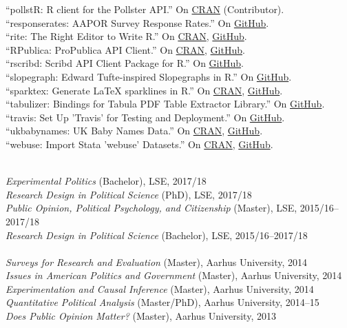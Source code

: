 \documentclass[12pt]{article}
\renewcommand{\section}[1]{\pagebreak[3]%
    \llap{\scshape\smash{\parbox[t]{\marginparwidth}{\raggedright {\color{lg}#1}}}}%
    \vspace{-\baselineskip}\par}
\newcommand{\topic}[1]{\pagebreak[3]\indent {\color{lg}{\footnotesize #1 }}\\}
\newcommand{\entry}[1]{\indent {\color{lg}\guillemotright}\hspace{2pt}#1\vspace{.25em}\\}
\begin{document}
	\entry{``pollstR: R client for the Pollster API.'' On \href{https://cran.r-project.org/package=pollstR}{CRAN} (Contributor).}
	\entry{``responserates: AAPOR Survey Response Rates.'' On \href{https://github.com/leeper/responserates}{GitHub}.}
	\entry{``rite: The Right Editor to Write R.'' On \href{https://cran.r-project.org/package=rite}{CRAN}, \href{https://github.com/leeper/rio}{GitHub}.}
	\entry{``RPublica: ProPublica API Client.'' On \href{https://cran.r-project.org/package=RPublica}{CRAN}, \href{https://github.com/rOpenGov/RPublica}{GitHub}.}
	\entry{``rscribd: Scribd API Client Package for R.'' On \href{https://github.com/cloudyr/rscribd}{GitHub}.}
	\entry{``slopegraph: Edward Tufte-inspired Slopegraphs in R.'' On \href{https://github.com/leeper/slopegraph}{GitHub}.}
	\entry{``sparktex: Generate LaTeX sparklines in R.'' On \href{https://cran.r-project.org/package=sparktex}{CRAN}, \href{https://github.com/leeper/sparktex}{GitHub}.}
	\entry{``tabulizer: Bindings for Tabula PDF Table Extractor Library.'' On \href{https://github.com/ropensci/tabulizer}{GitHub}.}
    \entry{``travis: Set Up 'Travis' for Testing and Deployment.'' On \href{https://github.com/ropenscilabs/travis}{GitHub}.}
	\entry{``ukbabynames: UK Baby Names Data.'' On \href{https://cran.r-project.org/package=ukbabynames}{CRAN}, \href{https://github.com/leeper/ukbabynames}{GitHub}.}
	\entry{``webuse: Import Stata 'webuse' Datasets.'' On \href{https://cran.r-project.org/package=webuse}{CRAN}, \href{https://github.com/leeper/webuse}{GitHub}.}
	
\section{Teaching \&\\ Advising}
\topic{Lecturing: London School of Economics and Political Science}
	\entry{\textit{Experimental Politics} (Bachelor), LSE, 2017/18}
	\entry{\textit{Research Design in Political Science} (PhD), LSE, 2017/18}
	\entry{\textit{Public Opinion, Political Psychology, and Citizenship} (Master), LSE, 2015/16--2017/18}
	\entry{\textit{Research Design in Political Science} (Bachelor), LSE, 2015/16--2017/18}

\topic{Lecturing: Aarhus University}
	\entry{\textit{Surveys for Research and Evaluation} (Master), Aarhus University, 2014}
	\entry{\textit{Issues in American Politics and Government} (Master), Aarhus University, 2014}
	\entry{\textit{Experimentation and Causal Inference} (Master), Aarhus University, 2014}
	\entry{\textit{Quantitative Political Analysis} (Master/PhD), Aarhus University, 2014--15}
	\entry{\textit{Does Public Opinion Matter?} (Master), Aarhus University, 2013}
\end{document}
